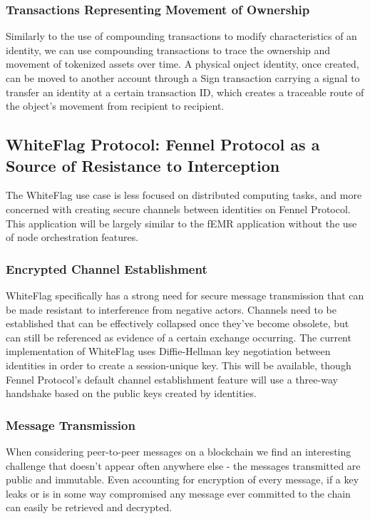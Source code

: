 \documentclass[]{article}
\begin{document}
\subsubsection{Transactions Representing Movement of Ownership}
\label{scrivauto:39}

Similarly to the use of compounding transactions to modify characteristics of an identity, we can use compounding transactions to trace the ownership and movement of tokenized assets over time. A physical onject identity, once created, can be moved to another account through a Sign transaction carrying a signal to transfer an identity at a certain transaction ID, which creates a traceable route of the object's movement from recipient to recipient.

\subsection{WhiteFlag Protocol: Fennel Protocol as a Source of Resistance to Interception}
\label{scrivauto:40}

The WhiteFlag use case is less focused on distributed computing tasks, and more concerned with creating secure channels between identities on Fennel Protocol. This application will be largely similar to the fEMR application without the use of node orchestration features.

\subsubsection{Encrypted Channel Establishment}
\label{scrivauto:41}

WhiteFlag specifically has a strong need for secure message transmission that can be made resistant to interference from negative actors. Channels need to be established that can be effectively collapsed once they've become obsolete, but can still be referenced as evidence of a certain exchange occurring. The current implementation of WhiteFlag uses Diffie-Hellman key negotiation between identities in order to create a session-unique key. This will be available, though Fennel Protocol's default channel establishment feature will use a three-way handshake based on the public keys created by identities.

\subsubsection{Message Transmission}
\label{scrivauto:42}

When considering peer-to-peer messages on a blockchain we find an interesting challenge that doesn't appear often anywhere else - the messages transmitted are public and immutable. Even accounting for encryption of every message, if a key leaks or is in some way compromised any message ever committed to the chain can easily be retrieved and decrypted.
\end{document}
